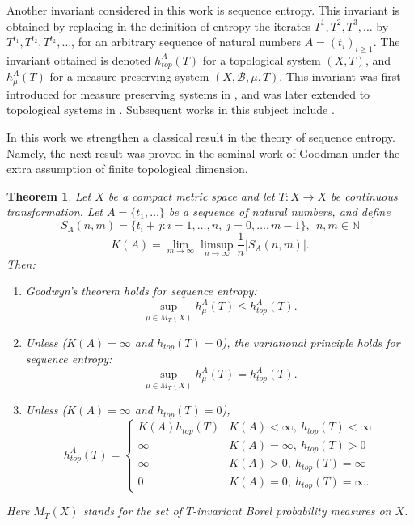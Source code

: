 \documentclass[a4paper,oneside]{amsart}
\renewcommand{\(}{\begin{dmath*}}
\renewcommand{\)}{\end{dmath*}}
\newtheorem{theorem}{Theorem}[section]
\theoremstyle{definition}
\newcommand{\N}{\mathbb{N}}
\begin{document}
Another invariant considered in this work is sequence entropy. This invariant is obtained by replacing in the definition of entropy the iterates $T^1,T^2,T^3,\dots$ by $T^{t_1},T^{t_2},T^{t_2},\dots$, for an arbitrary sequence of natural numbers $A=(t_i)_{i\geq 1}$. The invariant obtained is denoted $h^A_{top}(T)$ for a topological system $(X,T)$, and $h^A_{\mu}(T)$ for a measure preserving system $(X,\mathcal B,\mu, T)$. This invariant was first introduced for measure preserving systems in \cite{kushnirenko_metric_1967}, and was later extended to topological systems in \cite{goodman_topological_1974}. Subsequent works in this subject include \cite{gao_sequence_2020, canovas_interval_2000,hric_topological_nodate}. 

In this work we strengthen a classical result in the theory of sequence entropy. Namely, the next result was proved in the seminal work of Goodman  \cite[Theorems 4.1 and 4.4]{goodman_topological_1974} under the extra assumption of finite topological dimension. 
\begin{theorem}\label{Topological-kruw-newton}\label{goodman-v2}
Let $X$ be a compact metric space and let $T\colon X\to X$  be continuous  transformation. Let $A=\{t_1,\dots\}$ be a sequence of natural numbers, and define
\[S_A(n,m)=\{t_i+j : i=1,\dots,n,\ j=0,\dots,m-1\}, \ \ n,m\in\N\]
\begin{equation}\label{def:K}
K(A)=\lim_{m\to\infty} \limsup_{n\to\infty} \frac{1}{n}|S_A(n,m)|.
\end{equation}
Then:
\begin{enumerate}
    \item Goodwyn's theorem holds for sequence entropy:
    \[\sup_{\mu\in M_T(X)} h^{A}_{\mu}(T)\leq h^A_{top}(T).\]
    \item Unless ($K(A)=\infty$ and $h_{top}(T)=0$), the variational principle holds for sequence entropy:
    \[\sup_{\mu\in M_T(X)} h^{A}_{\mu}(T) = h^A_{top}(T).\]
    \item  Unless ($K(A)=\infty$ and $h_{top}(T)=0$), 
    \[h^A_{top}(T)= \begin{cases}
        K(A)h_{top}(T) &K(A)<\infty, \  h_{top}(T)<\infty\\
        \infty & K(A)=\infty, \ h_{top}(T)>0\\
        \infty & K(A)>0, \ h_{top}(T)=\infty\\
        0&  K(A)=0,  \ h_{top}(T)=\infty.
    \end{cases}
    \]
\end{enumerate}
Here $M_T(X)$ stands for the set of $T$-invariant Borel probability measures on $X$.
\end{theorem}
\end{document}
